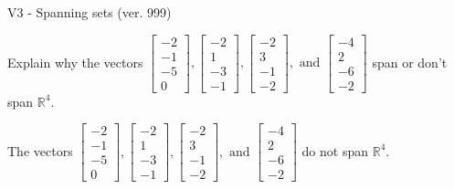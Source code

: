 \begin{exercise}
  \begin{exerciseTitle}V3 - Spanning sets (ver. 999)\end{exerciseTitle}
  \begin{exerciseStatement}
    Explain why the vectors \(\left[\begin{array}{r}
-2 \\
-1 \\
-5 \\
0
\end{array}\right] , \left[\begin{array}{r}
-2 \\
1 \\
-3 \\
-1
\end{array}\right] , \left[\begin{array}{r}
-2 \\
3 \\
-1 \\
-2
\end{array}\right] , \text{ and } \left[\begin{array}{r}
-4 \\
2 \\
-6 \\
-2
\end{array}\right]\) span or don't span \(\mathbb{R}^4\). 
	


  \end{exerciseStatement}
  \begin{exerciseAnswer}
   The vectors \(\left[\begin{array}{r}
-2 \\
-1 \\
-5 \\
0
\end{array}\right] , \left[\begin{array}{r}
-2 \\
1 \\
-3 \\
-1
\end{array}\right] , \left[\begin{array}{r}
-2 \\
3 \\
-1 \\
-2
\end{array}\right] , \text{ and } \left[\begin{array}{r}
-4 \\
2 \\
-6 \\
-2
\end{array}\right]\) 
  	 do not  
	span \(\mathbb{R}^4\).
  


  \end{exerciseAnswer}
\end{exercise}